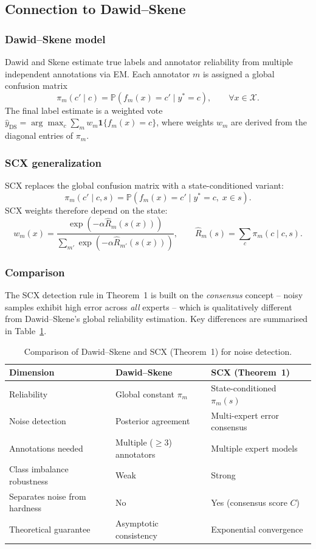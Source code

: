\subsection{Connection to Dawid--Skene}
\label{sec:thm1:dawid-skene}

\subsubsection*{Dawid--Skene model}
Dawid and Skene \cite{dawid1979} estimate true labels and annotator reliability
from multiple independent annotations via EM. Each annotator $m$ is assigned a
global confusion matrix
\[
\pi_m(c' \mid c) = \mathbb{P}(f_m(x) = c' \mid y^* = c), \qquad \forall x \in \mathcal{X}.
\]
The final label estimate is a weighted vote
$\hat{y}_{\text{DS}} = \arg\max_c \sum_m w_m \mathbf{1}\{f_m(x)=c\}$,
where weights $w_m$ are derived from the diagonal entries of $\pi_m$.

\subsubsection*{SCX generalization}
SCX replaces the global confusion matrix with a state-conditioned variant:
\[
\pi_m(c' \mid c, s) = \mathbb{P}(f_m(x) = c' \mid y^* = c,\; x \in s).
\]
SCX weights therefore depend on the state:
\[
w_m(x) = \frac{\exp(-\alpha \hat{R}_m(s(x)))}
              {\sum_{m'} \exp(-\alpha \hat{R}_{m'}(s(x)))},
\qquad \hat{R}_m(s) = \sum_c \pi_m(c \mid c, s).
\]

\subsubsection*{Comparison}
The SCX detection rule in Theorem~1 is built on the \emph{consensus} concept
-- noisy samples exhibit high error across \emph{all} experts -- which is
qualitatively different from Dawid--Skene's global reliability estimation.
Key differences are summarised in Table~\ref{tab:ds-vs-scx}.

\begin{table}[h]
\centering
\caption{Comparison of Dawid--Skene and SCX (Theorem~1) for noise detection.}
\label{tab:ds-vs-scx}
\begin{tabular}{lp{5.5cm}p{5.5cm}}
\toprule
Dimension & Dawid--Skene & SCX (Theorem~1) \\
\midrule
Reliability & Global constant $\pi_m$ & State-conditioned $\pi_m(s)$ \\
Noise detection & Posterior agreement & Multi-expert error consensus \\
Annotations needed & Multiple ($\geq 3$) annotators & Multiple expert models \\
Class imbalance robustness & Weak & Strong \\
Separates noise from hardness & No & Yes (consensus score $C$) \\
Theoretical guarantee & Asymptotic consistency & Exponential convergence \\
\bottomrule
\end{tabular}
\end{table}

